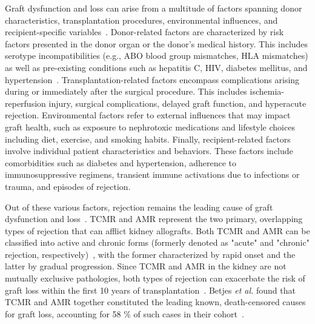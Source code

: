 Graft dysfunction and loss can arise from a multitude of factors spanning donor characteristics, transplantation procedures, environmental influences, and recipient-specific variables~\cite{alexandre_AntibodyMediated_2018}. Donor-related factors are characterized by risk factors presented in the donor organ or the donor's medical history. This includes serotype incompatibilities (e.g., ABO blood group mismatches, HLA mismatches) as well as pre-existing conditions such as hepatitis C, HIV, diabetes mellitus, and hypertension~\cite{shringi_EndStage_2026,loupy_Banff_2020}. Transplantation-related factors encompass complications arising during or immediately after the surgical procedure. This includes ischemia-reperfusion injury, surgical complications, delayed graft function, and hyperacute rejection. Environmental factors refer to external influences that may impact graft health, such as exposure to nephrotoxic medications and lifestyle choices including diet, exercise, and smoking habits. Finally, recipient-related factors involve individual patient characteristics and behaviors. These factors include comorbidities such as diabetes and hypertension, adherence to immunosuppressive regimens, transient immune activations due to infections or trauma, and episodes of rejection.


Out of these various factors, rejection remains the leading cause of graft dysfunction and loss~\cite{hariharan_LongTerm_2021}. TCMR and AMR represent the two primary, overlapping types of rejection that can afflict kidney allografts. Both TCMR and AMR can be classified into active and chronic forms (formerly denoted as "acute" and "chronic" rejection, respectively)~\cite{loupy_Subclinical_2015,loupy_Banff_2020}, with the former characterized by rapid onset and the latter by gradual progression. Since TCMR and AMR in the kidney are not mutually exclusive pathologies, both types of rejection can exacerbate the risk of graft loss within the first 10 years of transplantation~\cite{matignon_Concurrent_2012,betjes_Causes_2022}. Betjes \emph{et al.} found that TCMR and AMR together constituted the leading known, death-censored causes for graft loss, accounting for 58 \% of such cases in their cohort~\cite{betjes_Causes_2022}.

